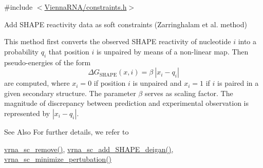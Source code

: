{\ttfamily \#include $<$\hyperlink{constraints_8h}{Vienna\-R\-N\-A/constraints.\-h}$>$}



Add S\-H\-A\-P\-E reactivity data as soft constraints (Zarringhalam et al. method) 

This method first converts the observed S\-H\-A\-P\-E reactivity of nucleotide $ i $ into a probability $ q_i $ that position $ i $ is unpaired by means of a non-\/linear map. Then pseudo-\/energies of the form \[ \Delta G_{\text{SHAPE}}(x,i) = \beta\ |x_i - q_i| \] are computed, where $ x_i=0 $ if position $ i $ is unpaired and $ x_i=1 $ if $ i $ is paired in a given secondary structure. The parameter $ \beta $ serves as scaling factor. The magnitude of discrepancy between prediction and experimental observation is represented by $ |x_i - q_i| $.

\begin{DoxySeeAlso}{See Also}
For further details, we refer to \cite{zarringhalam:2012} 

\hyperlink{group__soft__constraints_ga73cdc07b9a199c614367bebef0f2c41a}{vrna\-\_\-sc\-\_\-remove()}, \hyperlink{group__soft__constraints_ga57d612b58e1c61dd6cfcb5a843f8f1b3}{vrna\-\_\-sc\-\_\-add\-\_\-\-S\-H\-A\-P\-E\-\_\-deigan()}, \hyperlink{group__soft__constraints_gaa124bdc20d88001c38ade590c4bcc3c4}{vrna\-\_\-sc\-\_\-minimize\-\_\-pertubation()}
\end{DoxySeeAlso}

